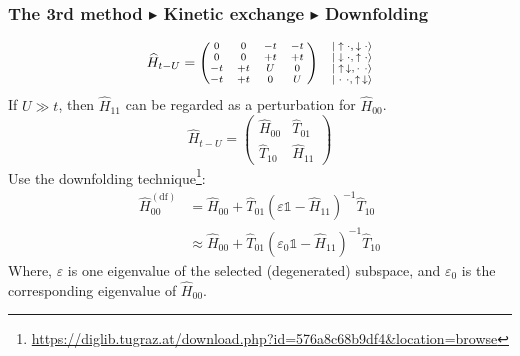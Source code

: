 \documentclass{beamer}
\begin{document}
  \begin{frame}
    \frametitle{The 3rd method \(\blacktriangleright\) Kinetic exchange \(\blacktriangleright\) Downfolding}
    \footnotesize
    \begin{equation*}\scriptsize
      \widehat{H}_{t-U} = \begin{pmatrix}
        0 &  0 & -t & -t \;\\
        0 &  0 & +t & +t \;\\
       -t & +t &  U &  0 \;\\
       -t & +t &  0 &  U \;
      \end{pmatrix}\ \ \ \begin{matrix}
        |\uparrow\cdot,\downarrow\cdot\rangle\\
        |\downarrow\cdot,\uparrow\cdot\rangle\\
        |\uparrow\hspace{0.15em}\downarrow,\cdot\hspace{0.4em}\cdot\rangle\\
        |\hspace{0.1em}\cdot\hspace{0.15em}\cdot,\uparrow\hspace{0.15em}\downarrow\rangle
      \end{matrix}
    \end{equation*}
    If \(U \gg t\), then \(\widehat{H}_{11}\) can be regarded as a perturbation for \(\widehat{H}_{00}\).
    \begin{equation}
      \widehat{H}_{t-U} = \begin{pmatrix}
        \widehat{H}_{00} & \widehat{T}_{01}\\
        \widehat{T}_{10} & \widehat{H}_{11}
      \end{pmatrix}
    \end{equation}
    Use the downfolding technique\footnote{\tiny\url{https://diglib.tugraz.at/download.php?id=576a8c68b9df4&location=browse}}:
    \begin{subequations}
      \begin{align}
        \widehat{H}_{00}^{(\text{df})} &= \widehat{H}_{00} + \widehat{T}_{01}\left(\varepsilon\mathbb{1}-\widehat{H}_{11}\right)^{-1}\widehat{T}_{10}\\
        &\approx  \widehat{H}_{00} + \widehat{T}_{01}\left(\varepsilon_0\mathbb{1}-\widehat{H}_{11}\right)^{-1}\widehat{T}_{10}
      \end{align}
    \end{subequations}
    Where, \(\varepsilon\) is one eigenvalue of the selected (degenerated) subspace, and \(\varepsilon_0\) is the corresponding eigenvalue of \(\widehat{H}_{00}\).
  \end{frame}
\end{document}
